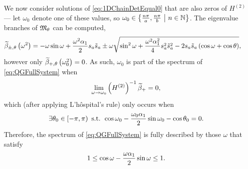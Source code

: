 We now consider solutions of \eqref{eq:1DChainDetEqual0} that are also zeros of $H^{(2)}$ --- let $\omega_0$ denote one of these values, so $\omega_0\in\left\{ \frac{n\pi}{a}, \frac{n\pi}{b} \ \middle\vert \  n\in\mathbb{N}  \right\}$.
The eigenvalue branches of $\mathfrak{M}_{\theta}$ can be computed,
\begin{align*}
	\widetilde{\beta}_{\pm, \theta}\left( \omega^2 \right) &= -\omega\sin\omega + \frac{\omega^2\alpha_1}{2}s_a \tilde{s}_a \pm \omega\sqrt{ \sin^2\omega + \frac{\omega^2\alpha_1^2}{4}s_a^2 \tilde{s}_a^2 - 2s_a \tilde{s}_a\left( \cos\omega+\cos\theta \right) },
\end{align*}
however only $\widetilde{\beta}_{+, \theta}\left( \omega_0^2 \right)=0$.
As such, $\omega_0$ is part of the spectrum of \eqref{eq:QGFullSystem} when
\begin{align*}
	\lim_{\omega\rightarrow\omega_0}\left(  H^{(2)}  \right)^{-1}\widetilde{\beta}_{+} = 0,
\end{align*}
which (after applying L'h\^ospital's rule) only occurs when
\begin{align*}
	\exists\theta_0\in\left[-\pi,\pi\right) \text{ s.t. } \cos\omega_0 - \frac{\omega_0\alpha_1}{2}\sin\omega_0 - \cos\theta_0 = 0. 
\end{align*}
Therefore, the spectrum of \eqref{eq:QGFullSystem} is fully described by those $\omega$ that satisfy
\begin{align*}
	\-1 \leq \cos\omega - \frac{\omega\alpha_1}{2}\sin\omega \leq 1.
\end{align*}

